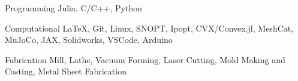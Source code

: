 

\begin{cvskills}

  \cvskill
    {Programming} %
    {Julia, C/C++, Python} %

  \cvskill
    {Computational} %
    {\LaTeX, Git, Linux, SNOPT, Ipopt, CVX/Convex.jl, MeshCat, MuJoCo, JAX, Solidworks, VSCode, Arduino} %

  \cvskill
    {Fabrication} %
    {Mill, Lathe, Vacuum Forming, Laser Cutting, Mold Making and Casting, Metal Sheet Fabrication} %

\end{cvskills}
